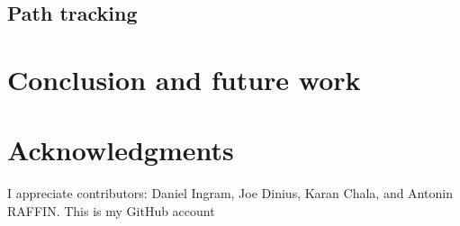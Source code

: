 \documentclass{bmvc2k}
\begin{document}
\subsection{Path tracking}


\section{Conclusion and future work}



\section{Acknowledgments}

I appreciate contributors: Daniel Ingram\cite{auther1}, Joe Dinius\cite{auther2}, Karan Chala\cite{auther3}, and Antonin RAFFIN\cite{auther4}. This is my GitHub account\cite{auther5}


\end{document}

